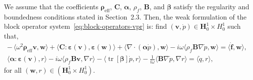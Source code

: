 \documentclass[pdflatex,sn-mathphys-num]{sn-jnl}
\theoremstyle{thmstyleone}%
\theoremstyle{thmstyletwo}%
\theoremstyle{thmstylethree}%
\def \div {\nabla\cdot}
\newtheorem{lemma}[theorem]{Lemma}
\theoremstyle{definition}
\begin{document}
	We assume that the coefficients $\boldsymbol{\rho}_{\text{eff}}$, $\mathbf{C}$, $\boldsymbol{\alpha}$, $\rho_f$, $\mathbf{B}$, and $\boldsymbol{\beta}$ satisfy the regularity and boundedness conditions stated in Section~2.3.  Then, the weak formulation of the block operator system~\eqref{eq:block-operators-vpr}
	is: find $(\mathbf{v}, \dot{p}) \in \bm{H}_{0}^{1} \times H_{0}^{1}$ such that,
	\begin{equation}\label{eq: weak form}
		\begin{aligned}
			-\,\langle \omega^2 \boldsymbol{\rho}_{\text{eff}} \mathbf{v}, \mathbf{w} \rangle
			+ \langle \mathbf{C} : \boldsymbol{\varepsilon}(\mathbf{v}), \boldsymbol{\varepsilon}(\mathbf{w}) \rangle
			+ \langle \div(\boldsymbol{\alpha} \dot{p}), \mathbf{w} \rangle
			- i\omega \langle \rho_f \mathbf{B} \nabla \dot{p}, \mathbf{w} \rangle
			= \langle \dot{\mathbf{f}}, \mathbf{w} \rangle, \\
			\langle \boldsymbol{\alpha}: \boldsymbol{\varepsilon}(\mathbf{v}),  r \rangle
			- i\omega \langle \rho_f \mathbf{B} \mathbf{v}, \nabla r \rangle
			- \langle \operatorname{tr}[\boldsymbol{\beta}] \dot{p}, r \rangle
			- \tfrac{1}{i\omega} \langle \mathbf{B} \nabla \dot{p}, \nabla r \rangle
			= \langle \dot{q}, r \rangle,
		\end{aligned}
	\end{equation}
	for all $(\mathbf{w}, r) \in \left(\bm{H}_{0}^{1} \times H_{0}^{1}\right)$.
	
	
\end{document}
